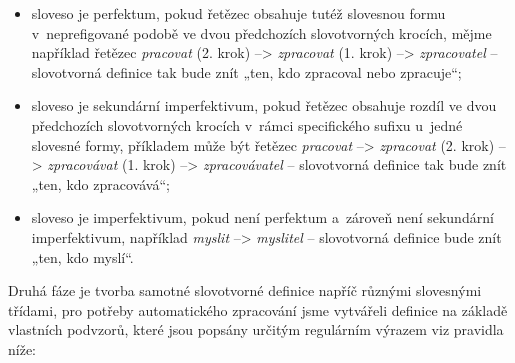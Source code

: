 \begin{itemize}
\tightlist
\item
  sloveso je perfektum, pokud řetězec obsahuje tutéž slovesnou formu
v~neprefigované podobě ve dvou předchozích slovotvorných krocích, mějme
  například řetězec \emph{pracovat} (2. krok) --\textgreater{}
  \emph{zpracovat} (1. krok) --\textgreater{} \emph{zpracovatel} --
  slovotvorná definice tak bude znít „ten, kdo zpracoval nebo
  zpracuje``;
\item
  sloveso je sekundární imperfektivum, pokud řetězec obsahuje rozdíl ve
  dvou předchozích slovotvorných krocích v~rámci specifického sufixu
u~jedné slovesné formy, příkladem může být řetězec \emph{pracovat}
  --\textgreater{} \emph{zpracovat} (2. krok) --\textgreater{}
  \emph{zpracovávat} (1. krok) --\textgreater{} \emph{zpracovávatel} --
  slovotvorná definice tak bude znít „ten, kdo zpracovává``;
\item
  sloveso je imperfektivum, pokud není perfektum a~zároveň není
  sekundární imperfektivum, například \emph{myslit} --\textgreater{}
  \emph{myslitel} -- slovotvorná definice bude znít „ten, kdo myslí``.
\end{itemize}

Druhá fáze je tvorba samotné slovotvorné definice napříč různými
slovesnými třídami, pro potřeby automatického zpracování jsme vytvářeli
definice na základě vlastních podvzorů, které jsou popsány určitým
regulárním výrazem viz pravidla níže:

